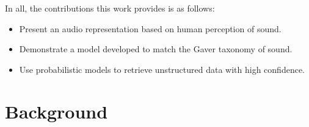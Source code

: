 
In all, the contributions this work provides is as follows:
\begin{itemize}
    \item Present an audio representation based on human perception of sound.
    \item Demonstrate a model developed to match the Gaver taxonomy of sound.
    \item Use probabilistic models to retrieve unstructured data with high confidence.
\end{itemize}

\section{Background}
